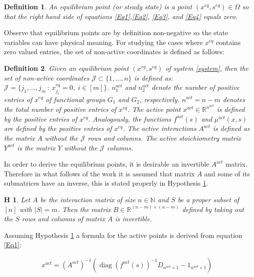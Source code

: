 \documentclass[processes,article,submit,moreauthors,pdftex]{Definitions/mdpi}
\newcommand{\N}{\mathbb{N}}
\newcommand{\R}{\mathbb{R}}
\DeclareMathOperator{\diag}{diag}
\newtheorem{defn}{Definition}
\newtheorem{hypo}{H}
\begin{document}
\begin{defn} 
	An equilibrium point (or steady state) is a point $(x^{eq},s^{eq}) \in \Omega$ so that the right hand side of equations \eqref{Eq1},\eqref{Eq2}, \eqref{Eq3}, and \eqref{Eq4} equals zero. 
\end{defn} 

Observe that equilibrium points are by definition non-negative so the state variables can have physical meaning. For studying the cases where $x^{eq}$ contains zero valued entries, the set of non-active coordinates is defined as follows:

\begin{defn}
	Given an equilibrium point $(x^{eq},s^{eq})$ of system \eqref{system}, then the set of non-active coordinates $\mathcal{J}\subset \{1,\dots,n\}$ is defined as:
	$\mathcal{J} = \{j_1, \dots, j_m\ : \, x^{eq}_{j_i} = 0 , \;i \in [m] \} $. $n_1^{act}$ and $n_2^{act}$ denote the number of positive entries of $x^{eq}$ of functional groups $G_1$ and $G_2$, respectively. $n^{act} = n-m$ denotes the total number of positive entries of $x^{eq}$. The active point $x^{act}\in \R^{n^{act}}$ is defined by the positive entries of $x^{eq}$. Analogously, the functions $f^{act}(s)$ and $\mu^{act}(x,s)$ are defined by the positive entries of $x^{eq}$. The active interactions $A^{act}$ is defined as the matrix $A$ without the $\mathcal{J}$ rows and columns. The active stoichiometry matrix $Y^{act}$ is the matrix $Y$ without the $\mathcal{J}$ columns. 
\end{defn}

In order to derive the equilibrium points, it is desirable an invertible $A^{act}$ matrix. Therefore in what follows of the work it is assumed that matrix $A$ and some of its submatrices have an inverse, this is stated properly in Hypothesis \ref{inverse hypothesis}. 

\begin{hypo}
	Let $A$ be the interaction matrix of size $n \in \N$ and $S$ be a proper subset of $[n]$ with $|S| = m$. Then the matrix $B \in \R^{(n-m) \times (n-m)}$ defined by taking out the $S$ rows and columns of matrix $A$ is invertible.
	\label{inverse hypothesis}
\end{hypo} 

Assuming Hypothesis \ref{inverse hypothesis} a formula for the active points is derived from equation \eqref{Eq1}:

\begin{align}
\label{EqSome}x^{act} = (A^{act})^{-1}(\diag(f^{act}(s))^{-1}D_{n^{act}\times 1} - 1_{n^{act}\times 1})
\end{align} 
\end{document}
